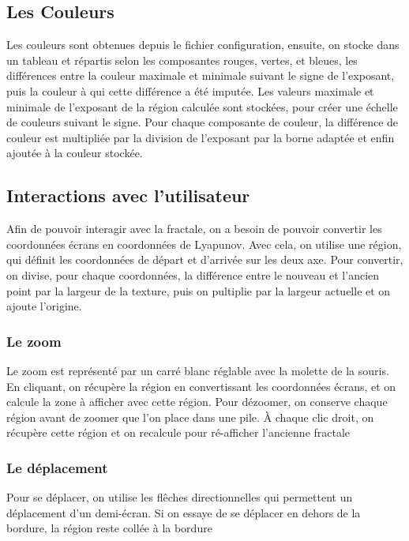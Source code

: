 \documentclass{article}
\begin{document}
	\subsection{Les Couleurs}

	Les couleurs sont obtenues depuis le fichier configuration, ensuite, on stocke dans un tableau et répartis selon les composantes rouges, vertes, et bleues, les différences entre la couleur maximale et minimale suivant le signe de l'exposant, puis la couleur à qui cette différence a été imputée.
	Les valeurs maximale et minimale de l'exposant de la région calculée sont stockées, pour créer une échelle de couleurs suivant le signe.
	Pour chaque composante de couleur, la différence de couleur est multipliée par la division de l'exposant par la borne adaptée et enfin ajoutée à la couleur stockée.

	\subsection{Interactions avec l'utilisateur}

	Afin de pouvoir interagir avec la fractale, on a besoin de pouvoir convertir les coordonnées écrans en coordonnées de Lyapunov.
	Avec cela, on utilise une région, qui définit les coordonnées de départ et d'arrivée sur les deux axe.
	Pour convertir, on divise, pour chaque coordonnées, la différence entre le nouveau et l'ancien point par la largeur de la texture, puis on pultiplie par la largeur actuelle et on ajoute l'origine.

	\subsubsection{Le zoom}

	Le zoom est représenté par un carré blanc réglable avec la molette de la souris.
	En cliquant, on récupère la région en convertissant les coordonnées écrans, et on calcule la zone à afficher avec cette région.
	Pour dézoomer, on conserve chaque région avant de zoomer que l'on place dans une pile.
	À chaque clic droit, on récupère cette région et on recalcule pour ré-afficher l'ancienne fractale

	\subsubsection{Le déplacement}

	Pour se déplacer, on utilise les flêches directionnelles qui permettent un déplacement d'un demi-écran.
	Si on essaye de se déplacer en dehors de la bordure, la région reste collée à la bordure
\end{document}
